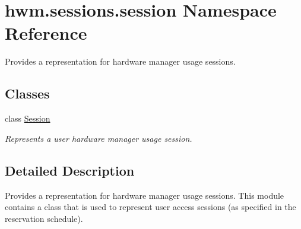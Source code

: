 \hypertarget{namespacehwm_1_1sessions_1_1session}{\section{hwm.\-sessions.\-session Namespace Reference}
\label{namespacehwm_1_1sessions_1_1session}
}


Provides a representation for hardware manager usage sessions.  


\subsection*{Classes}
\begin{DoxyCompactItemize}
\item 
class \hyperlink{classhwm_1_1sessions_1_1session_1_1_session}{Session}
\begin{DoxyCompactList}\small\item\em Represents a user hardware manager usage session. \end{DoxyCompactList}\end{DoxyCompactItemize}


\subsection{Detailed Description}
Provides a representation for hardware manager usage sessions. This module contains a class that is used to represent user access sessions (as specified in the reservation schedule). 